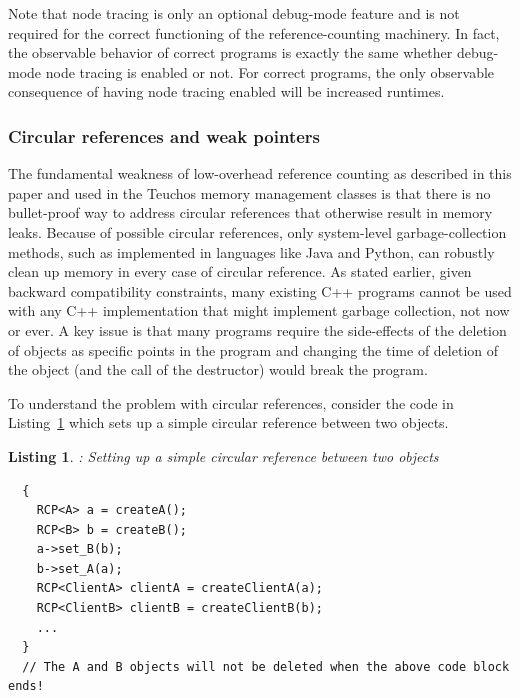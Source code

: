 \documentclass[pdf,ps2pdf,11pt]{SANDreport}
\newtheorem{listing}{Listing}
\begin{document}
Note that node tracing is only an optional debug-mode feature and is
not required for the correct functioning of the reference-counting
machinery.  In fact, the observable behavior of correct programs is
exactly the same whether debug-mode node tracing is enabled or not.
For correct programs, the only observable consequence of having node
tracing enabled will be increased runtimes.


%
{}\subsubsection{Circular references and weak pointers}
\label{sec:circular-references-weak-pointers}
%

The fundamental weakness of low-overhead reference counting as
described in this paper and used in the Teuchos memory management
classes is that there is no bullet-proof way to address circular
references that otherwise result in memory leaks.  Because of possible
circular references, only system-level garbage-collection methods,
such as implemented in languages like Java and Python, can robustly
clean up memory in every case of circular reference.  As stated
earlier, given backward compatibility constraints, many existing C++
programs cannot be used with any C++ implementation that might
implement garbage collection, not now or ever.  A key issue is that
many programs require the side-effects of the deletion of objects as
specific points in the program and changing the time of deletion of
the object (and the call of the destructor) would break the program.

To understand the problem with circular references, consider the code
in Listing~\ref{listing:CircularRCP_A_B} which sets up a simple
circular reference between two objects.


\begin{listing}: Setting up a simple circular reference between two objects \\
\label{listing:CircularRCP_A_B}
{\small\begin{verbatim}
  {
    RCP<A> a = createA();
    RCP<B> b = createB();
    a->set_B(b);
    b->set_A(a);
    RCP<ClientA> clientA = createClientA(a);
    RCP<ClientB> clientB = createClientB(b);
    ...
  }
  // The A and B objects will not be deleted when the above code block ends!
\end{verbatim}}
\end{listing}
\end{document}
